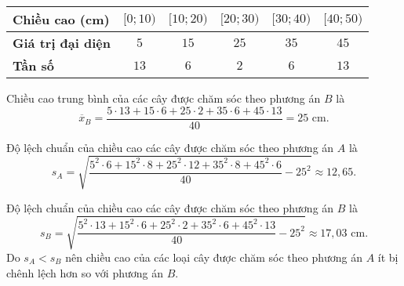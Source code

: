 \begin{ex}
{\begin{enumEX}{1}
\begin{center}
\begin{tabular}{|l|c|c|c|c|c|}
					\textbf{Chiều cao (cm)}   & $[0; 10)$ & $ [10; 20)$ & $ [20; 30)$ & $ [30; 40)$ & $ [40; 50)$ \\
					\hline
					\textbf{Giá trị đại diện} & $5$       & $15$        & $25$        & $35$        & $45$        \\ \hline
					\textbf{Tần số }          & $ 13 $    & $6$         & $2$         & $6$         & $13$        \\
					\hline \hline
				\end{tabular}
			\end{center}
			Chiều cao trung bình của các cây được chăm sóc theo phương án $B$ là $$\overline{x}_B= \dfrac{5 \cdot 13 + 15 \cdot 6 + 25 \cdot 2 + 35 \cdot 6 + 45 \cdot 13}{40}=25 \text{ cm}.$$
			\item 	Độ lệch chuẩn của chiều cao các cây được chăm sóc theo phương án $A$ là $$s_A =\sqrt{\dfrac{5^2 \cdot 6 + 15^2 \cdot 8 + 25^2 \cdot 12 + 35^2 \cdot 8 + 45 ^2 \cdot 6}{40} - 25^2}\approx 12{,} 65. $$
			\item Độ lệch chuẩn của chiều cao các cây được chăm sóc theo phương án $B$ là $$s_B =\sqrt{\dfrac{5^2 \cdot 13 + 15^2 \cdot 6 + 25^2 \cdot 2 + 35^2 \cdot 6+ 45 ^2 \cdot 13}{40} - 25^2}\approx 17{,} 03 \text{ cm}. $$
			Do $s_A< s_B$ nên chiều cao của các loại cây được chăm sóc theo phương án $A$ ít bị chênh lệch hơn so với phương án $B$.
		\end{enumEX}}
\end{ex}
